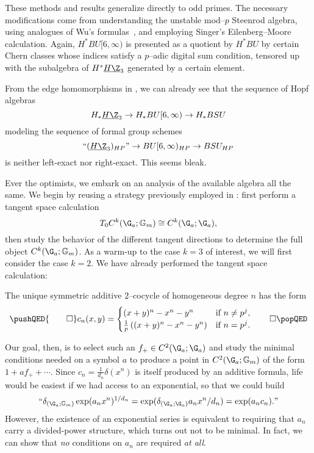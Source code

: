 \begin{remark}
These methods and results generalize directly to odd primes.  The necessary modifications come from understanding the unstable mod--$p$ Steenrod algebra, using analogues of Wu's formulas~\cite{Shay}, and employing Singer's Eilenberg--Moore calculation.  Again, $H^* BU[6, \infty)$ is presented as a quotient by $H^* BU$ by certain Chern classes whose indices satisfy a $p$--adic digital sum condition, tensored up with the subalgebra of $H^* \OS{H\Z}{3}$ generated by a certain element.
\end{remark}

From the edge homomorphisms in , we can already see that the sequence of Hopf algebras \[H_* \OS{H\Z}{3} \to H_* BU[6, \infty) \to H_* BSU\] modeling the sequence of formal group schemes \[\text{``$(\OS{H\Z}{3})_{HP}$''} \to BU[6, \infty)_{HP} \to BSU_{HP}\] is neither left-exact nor right-exact.  This seems bleak.

Ever the optimists, we embark on an analysis of the available algebra all the same.  We begin by reusing a strategy previously employed in : first perform a tangent space calculation \[T_0 C^k(\G_a; \Gm) \cong C^k(\G_a; \G_a),\] then study the behavior of the different tangent directions to determine the full object $C^k(\G_a; \Gm)$.  As a warm-up to the case $k = 3$ of interest, we will first consider the case $k = 2$.  We have already performed the tangent space calculation:

\begin{corollary}
The unique symmetric additive $2$--cocycle of homogeneous degree $n$ has the form
\[\pushQED{\qed}
c_n(x, y) = \begin{cases} (x + y)^n - x^n - y^n & \text{if $n \ne p^j$}, \\ \frac{1}{p} \left( (x + y)^n - x^n - y^n \right) & \text{if $n = p^j$}. \end{cases} \qedhere
\popQED\]
\end{corollary}

Our goal, then, is to select such an $f_+ \in C^2(\G_a; \G_a)$ and study the minimal conditions needed on a symbol $a$ to produce a point in $C^2(\G_a; \Gm)$ of the form $1 + af_+ + \cdots$.  Since $c_n = \frac{1}{d_n} \delta(x^n)$ is itself produced by an additive formula, life would be easiest if we had access to an exponential, so that we could build \[\text{``$ \delta_{(\G_a; \Gm)} \exp(a_n x^n)^{1/d_n} = \exp(\delta_{(\G_a; \G_a)} a_n x^n / d_n) = \exp(a_n c_n). $''}\]  However, the existence of an exponential series is equivalent to requiring that $a_n$ carry a divided-power structure, which turns out not to be minimal.  In fact, we can show that \emph{no} conditions on $a_n$ are required \emph{at all}.

